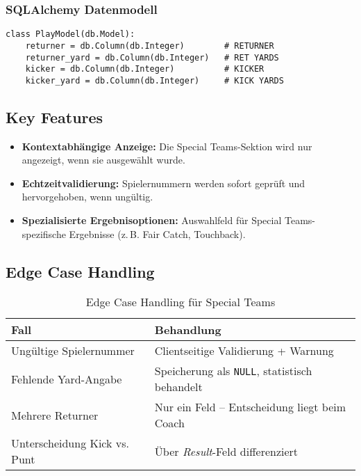 \subsubsection{SQLAlchemy Datenmodell}

\begin{verbatim}
class PlayModel(db.Model):
    returner = db.Column(db.Integer)        # RETURNER
    returner_yard = db.Column(db.Integer)   # RET YARDS
    kicker = db.Column(db.Integer)          # KICKER
    kicker_yard = db.Column(db.Integer)     # KICK YARDS
\end{verbatim}

\subsection{Key Features}

\begin{itemize}
  \item \textbf{Kontextabhängige Anzeige:} Die Special Teams-Sektion wird nur angezeigt, wenn sie ausgewählt wurde.
  \item \textbf{Echtzeitvalidierung:} Spielernummern werden sofort geprüft und hervorgehoben, wenn ungültig.
  \item \textbf{Spezialisierte Ergebnisoptionen:} Auswahlfeld für Special Teams-spezifische Ergebnisse (z.\,B. Fair Catch, Touchback).
\end{itemize}


\subsection{Edge Case Handling}

\begin{table}[h!]
\centering
\begin{tabular}{|l|p{10cm}|}
\hline
\textbf{Fall} & \textbf{Behandlung} \\
\hline
Ungültige Spielernummer & Clientseitige Validierung + Warnung \\
Fehlende Yard-Angabe & Speicherung als \texttt{NULL}, statistisch behandelt \\
Mehrere Returner & Nur ein Feld – Entscheidung liegt beim Coach \\
Unterscheidung Kick vs. Punt & Über \textit{Result}-Feld differenziert \\
\hline
\end{tabular}
\caption{Edge Case Handling für Special Teams}
\end{table}


